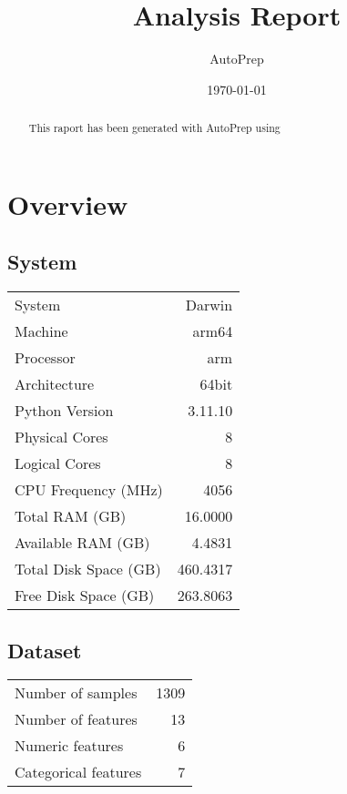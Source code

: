 \documentclass{article}%
\title{Analysis Report}%
\author{AutoPrep}%
\date{\today}%
\begin{document}
%
\normalsize%
\maketitle%

                \begin{abstract}
                This raport has been generated with AutoPrep using
                \end{abstract}
\tableofcontents%
\newpage%
\section{Overview}%
\label{sec:Overview}%

%
\subsection{System}%
\label{subsec:System}%

%


\begin{table}[H]%
\begin{center}%
\begin{tabular}{l r}%
\hline%
System&Darwin\\%
Machine&arm64\\%
Processor&arm\\%
Architecture&64bit\\%
Python Version&3.11.10\\%
Physical Cores&8\\%
Logical Cores&8\\%
CPU Frequency (MHz)&4056\\%
Total RAM (GB)&16.0000\\%
Available RAM (GB)&4.4831\\%
Total Disk Space (GB)&460.4317\\%
Free Disk Space (GB)&263.8063\\%
\hline%
\end{tabular}%
\end{center}%
\end{table}

%
\subsection{Dataset}%
\label{subsec:Dataset}%

%


\begin{table}[H]%
\begin{center}%
\begin{tabular}{l r}%
\hline%
Number of samples&1309\\%
Number of features&13\\%
Numeric features&6\\%
Categorical features&7\\%
\hline%
\end{tabular}%
\end{center}%
\end{table}
\end{document}
